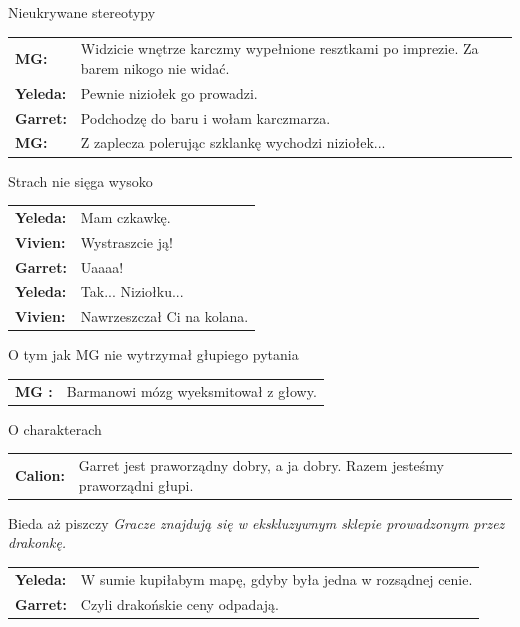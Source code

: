 \documentclass[10pt,twoside,twocolumn]{book}
\begin{document}
\begin{rpg-quotebox}{Nieukrywane stereotypy}
   \begin{tabularx}{\columnwidth}{lX}
      \textbf{MG:} & Widzicie wnętrze karczmy wypełnione resztkami po imprezie. Za barem nikogo nie widać.\\
      \textbf{Yeleda:} & Pewnie niziołek go prowadzi.\\
      \textbf{Garret:} & Podchodzę do baru i wołam karczmarza.\\
      \textbf{MG:} & Z zaplecza polerując szklankę wychodzi niziołek...\\
   \end{tabularx}
\end{rpg-quotebox}


\begin{rpg-quotebox}{Strach nie sięga wysoko}
   \begin{tabularx}{\columnwidth}{lX}
      \textbf{Yeleda:} & Mam czkawkę.\\
      \textbf{Vivien:} & Wystraszcie ją!\\
      \textbf{Garret:} & Uaaaa!\\
      \textbf{Yeleda:} & Tak... Niziołku...\\
      \textbf{Vivien:} & Nawrzeszczał Ci na kolana.\\
   \end{tabularx}
\end{rpg-quotebox}


\begin{rpg-quotebox}{O tym jak MG nie wytrzymał głupiego pytania}
   \begin{tabularx}{\columnwidth}{lX}
      \textbf{MG :} & Barmanowi mózg wyeksmitował z głowy.\\
   \end{tabularx}
\end{rpg-quotebox}


\begin{rpg-quotebox}{O charakterach}
   \begin{tabularx}{\columnwidth}{lX}
      \textbf{Calion:} & Garret jest praworządny dobry, a ja dobry. Razem jesteśmy praworządni głupi.\\
   \end{tabularx}
\end{rpg-quotebox}


\begin{rpg-quotebox}{Bieda aż piszczy}
   \textit{Gracze znajdują się w ekskluzywnym sklepie prowadzonym przez drakonkę.} \\

   \begin{tabularx}{\columnwidth}{lX}
      \textbf{Yeleda:} & W sumie kupiłabym mapę, gdyby była jedna w rozsądnej cenie.\\
      \textbf{Garret:} & Czyli drakońskie ceny odpadają.\\
   \end{tabularx}
\end{rpg-quotebox}
\end{document}

